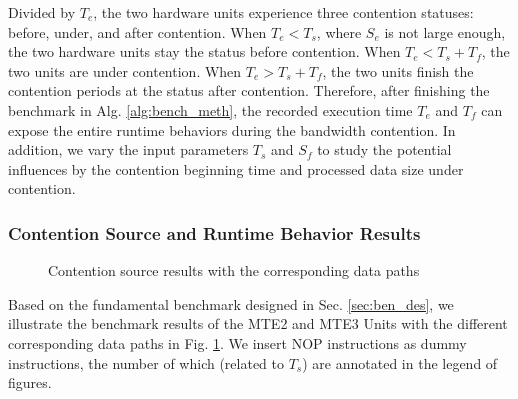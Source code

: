 Divided by $T_{e}$, the two hardware units experience three contention statuses: before, under, and after contention. When $T_{e} < T_{s}$, where $S_{e}$ is not large enough, the two hardware units stay the status before contention. When $T_{e} < T_{s} + T_{f}$, the two units are under contention. When $T_{e} > T_{s} + T_{f}$, the two units finish the contention periods at the status after contention. Therefore, after finishing the benchmark in Alg. \ref{alg:bench_meth}, the recorded execution time $T_{e}$ and $T_{f}$ can expose the entire runtime behaviors during the bandwidth contention. In addition, we vary the input parameters $T_{s}$ and $S_{f}$ to study the potential influences by the contention beginning time and processed data size under contention.

\subsubsection{Contention Source and Runtime Behavior Results \label{sec:runtime}}

\begin{figure}[t]
    \caption{Contention source results with the corresponding data paths}
    \label{fig:cont_source}
    \end{figure}

Based on the fundamental benchmark designed in Sec. \ref{sec:ben_des}, we illustrate the benchmark results of the MTE2 and MTE3 Units with the different corresponding data paths in Fig. \ref{fig:cont_source}. We insert NOP instructions as dummy instructions, the number of which (related to $T_s$) are annotated in the legend of figures.

